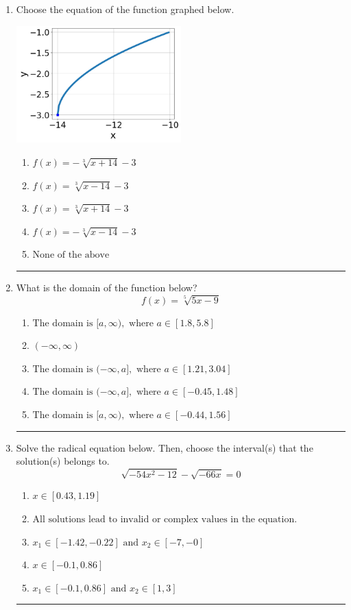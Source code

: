 \documentclass[14pt]{extbook}
\newcommand{\litem}[1]{\item#1\hspace*{-1cm}\rule{\textwidth}{0.4pt}}
\begin{document}
\begin{enumerate}
\litem{
Choose the equation of the function graphed below.
\begin{center}
    \includegraphics[width=0.5\textwidth]{../Figures/radicalGraphToEquationCopyB.png}
\end{center}
\begin{enumerate}[label=\Alph*.]
\item \( f(x) = - \sqrt[3]{x + 14} - 3 \)
\item \( f(x) = \sqrt[3]{x - 14} - 3 \)
\item \( f(x) = \sqrt[3]{x + 14} - 3 \)
\item \( f(x) = - \sqrt[3]{x - 14} - 3 \)
\item \( \text{None of the above} \)

\end{enumerate} }
\litem{
What is the domain of the function below?\[ f(x) = \sqrt[5]{5 x - 9} \]\begin{enumerate}[label=\Alph*.]
\item \( \text{The domain is } [a, \infty), \text{   where } a \in [1.8, 5.8] \)
\item \( (-\infty, \infty) \)
\item \( \text{The domain is } (-\infty, a], \text{   where } a \in [1.21, 3.04] \)
\item \( \text{The domain is } (-\infty, a], \text{   where } a \in [-0.45, 1.48] \)
\item \( \text{The domain is } [a, \infty), \text{   where } a \in [-0.44, 1.56] \)

\end{enumerate} }
\litem{
Solve the radical equation below. Then, choose the interval(s) that the solution(s) belongs to.\[ \sqrt{-54 x^2 - 12} - \sqrt{-66 x} = 0 \]\begin{enumerate}[label=\Alph*.]
\item \( x \in [0.43,1.19] \)
\item \( \text{All solutions lead to invalid or complex values in the equation.} \)
\item \( x_1 \in [-1.42, -0.22] \text{ and } x_2 \in [-7,-0] \)
\item \( x \in [-0.1,0.86] \)
\item \( x_1 \in [-0.1, 0.86] \text{ and } x_2 \in [1,3] \)


\end{enumerate}}
\end{enumerate}
\end{document}
